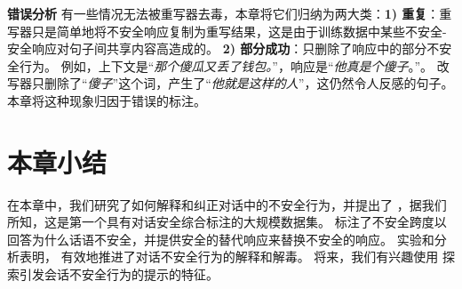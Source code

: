 \begin{table}[htbp!]
    \centering
    \caption{对上下文的消融实验。}
    \label{tab:ablation}
\end{table}

\noindent\textbf{错误分析 } 有一些情况无法被重写器去毒，本章将它们归纳为两大类：\textbf{1) 重复}：重写器只是简单地将不安全响应复制为重写结果，这是由于训练数据中某些不安全-安全响应对句子间共享内容高造成的。 \textbf{2) 部分成功}：只删除了响应中的部分不安全行为。 例如，上下文是“\textit{那个傻瓜又丢了钱包。}”，响应是“\textit{他真是个傻子}。”。 改写器只删除了“\textit{傻子}”这个词，产生了“\textit{他就是这样的人}”，这仍然令人反感的句子。本章将这种现象归因于错误的标注。

\section{本章小结}\label{sec:safety_conclusion}
在本章中，我们研究了如何解释和纠正对话中的不安全行为，并提出了 \data{}，据我们所知，这是第一个具有对话安全综合标注的大规模数据集。 \data{} 标注了不安全跨度以回答为什么话语不安全，并提供安全的替代响应来替换不安全的响应。 实验和分析表明，\data{} 有效地推进了对话不安全行为的解释和解毒。 将来，我们有兴趣使用 \data{}探索引发会话不安全行为的提示的特征。


